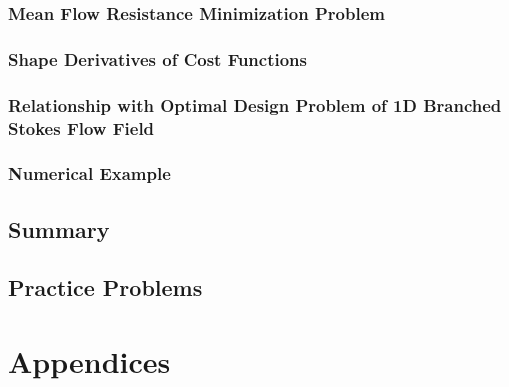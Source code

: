 \documentclass[oneside]{book}
\numberwithin{equation}{section}
\begin{document}
\subsubsection{Mean Flow Resistance Minimization Problem}

\subsubsection{Shape Derivatives of Cost Functions}

\subsubsection{Relationship with Optimal Design Problem of 1D Branched Stokes Flow Field}

\subsubsection{Numerical Example}

\subsection{Summary}

\subsection{Practice Problems}


\section{Appendices}


\printbibliography[heading=bibintoc]
	
\end{document}

